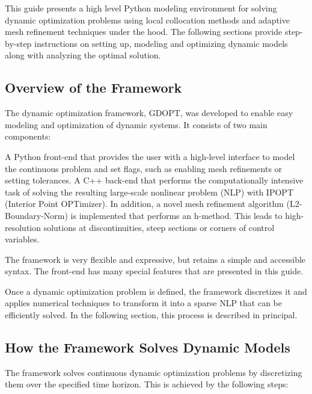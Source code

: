 \documentclass[12pt]{article}
\begin{document}
This guide presents a high level Python modeling environment for
solving dynamic optimization problems using local collocation methods and
adaptive mesh refinement techniques under the hood.
The following sections provide
step-by-step instructions on setting up, modeling and optimizing dynamic models
along with analyzing the optimal solution.

\subsection{Overview of the Framework} \label{c:overview}

The dynamic optimization framework, GDOPT, was developed to enable easy modeling and optimization of dynamic systems. It consists of two main components:

A Python front-end that provides the user with a high-level interface to model the continuous problem and set flags, such as enabling mesh refinements or setting tolerances.
A C++ back-end that performs the computationally intensive task of solving the resulting large-scale nonlinear problem (NLP) with IPOPT (Interior Point OPTimizer). In addition, a novel mesh refinement algorithm (L2-Boundary-Norm) is implemented that performs an h-method. This leads to high-resolution solutions at discontinuities, steep sections or corners of control variables.

The framework is very flexible and expressive, but retains a simple and accessible syntax. The front-end has many special features that are presented in this guide.

Once a dynamic optimization problem is defined, the framework discretizes it and applies numerical techniques to transform it into a sparse NLP that can be efficiently solved. In the following section, this process is described in principal.

\subsection{How the Framework Solves Dynamic Models} \label{c:collocation}

The framework solves continuous dynamic optimization problems by discretizing them over the specified time horizon. This is achieved by the following steps:
\end{document}
